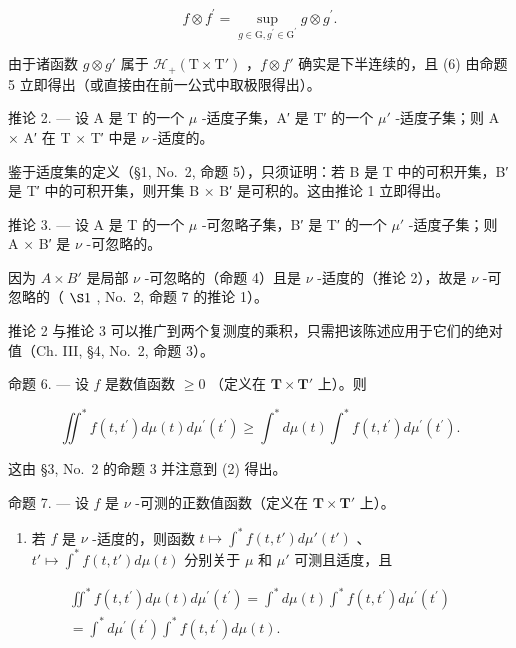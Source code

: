 \[
f \otimes f ^ {\prime} = \sup _ {g \in \mathrm{G}, g ^ {\prime} \in \mathrm{G} ^ {\prime}} g \otimes g ^ {\prime}.
\]

由于诸函数 \(g \otimes g'\) 属于 \(\mathcal{H}_{+}(\mathrm{T} \times \mathrm{T}')\) ，\(f \otimes f'\) 确实是下半连续的，且 (6) 由命题 5 立即得出（或直接由在前一公式中取极限得出）。

推论 2. --- 设 A 是 T 的一个 \(\mu\) -适度子集，A′ 是 T′ 的一个 \(\mu'\) -适度子集；则 A × A′ 在 T × T′ 中是 \(\nu\) -适度的。

鉴于适度集的定义（§1, No.~2, 命题 5），只须证明：若 B 是 T 中的可积开集，B′ 是 T′ 中的可积开集，则开集 B × B′ 是可积的。这由推论 1 立即得出。

推论 3. --- 设 A 是 T 的一个 \(\mu\) -可忽略子集，B′ 是 T′ 的一个 \(\mu'\) -适度子集；则 A × B′ 是 \(\nu\) -可忽略的。

因为 \(A \times B'\) 是局部 \(\nu\) -可忽略的（命题 4）且是 \(\nu\) -适度的（推论 2），故是 \(\nu\) -可忽略的（ \(\S1\) , No.~2, 命题 7 的推论 1）。

推论 2 与推论 3 可以推广到两个复测度的乘积，只需把该陈述应用于它们的绝对值（Ch. III, §4, No.~2, 命题 3）。

命题 6. --- 设 \(f\) 是数值函数 \(\geqslant 0\) （定义在 \(\mathbf{T} \times \mathbf{T}'\) 上）。则

\[
\iint^ {*} f (t, t ^ {\prime}) d \mu (t) d \mu^ {\prime} (t ^ {\prime}) \geqslant \int^ {*} d \mu (t) \int^ {*} f (t, t ^ {\prime}) d \mu^ {\prime} (t ^ {\prime}).
\]

这由 §3, No.~2 的命题 3 并注意到 (2) 得出。

命题 7. --- 设 \(f\) 是 \(\nu\) -可测的正数值函数（定义在 \(\mathbf{T} \times \mathbf{T}'\) 上）。

\begin{enumerate}
\def\labelenumi{\alph{enumi})}
\tightlist
\item
  若 \(f\) 是 \(\nu\) -适度的，则函数 \(t \mapsto \int^{*} f(t, t') d\mu'(t')\) 、\(t' \mapsto \int^{*} f(t, t') d\mu(t)\) 分别关于 \(\mu\) 和 \(\mu'\) 可测且适度，且
\end{enumerate}

\[
\begin{array}{r} \iint^ {*} f (t, t ^ {\prime}) d \mu (t) d \mu^ {\prime} (t ^ {\prime}) = \int^ {*} d \mu (t) \int^ {*} f (t, t ^ {\prime}) d \mu^ {\prime} (t ^ {\prime}) \\ = \int^ {*} d \mu^ {\prime} (t ^ {\prime}) \int^ {*} f (t, t ^ {\prime}) d \mu (t). \end{array}\tag{7}
\]

